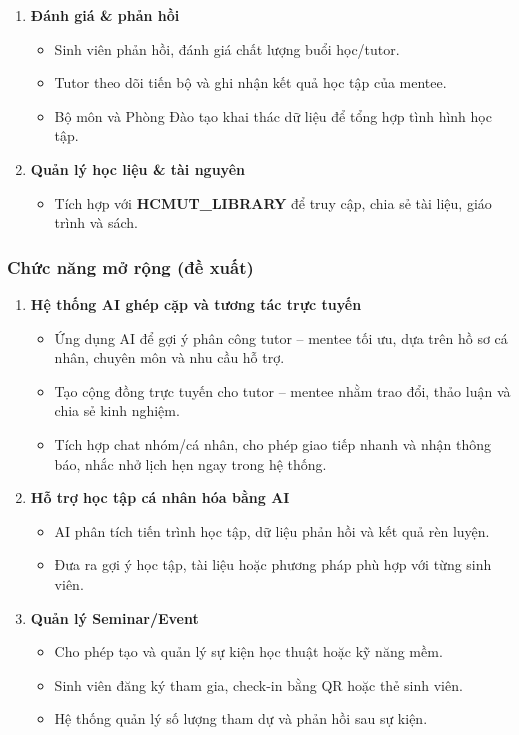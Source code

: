 \begin{enumerate}
    \item \textbf{Đánh giá \& phản hồi}
    \begin{itemize}
        \item Sinh viên phản hồi, đánh giá chất lượng buổi học/tutor.
        \item Tutor theo dõi tiến bộ và ghi nhận kết quả học tập của mentee.
        \item Bộ môn và Phòng Đào tạo khai thác dữ liệu để tổng hợp tình hình học tập.
    \end{itemize}

    \item \textbf{Quản lý học liệu \& tài nguyên}
    \begin{itemize}
        \item Tích hợp với \textbf{HCMUT\_LIBRARY} để truy cập, chia sẻ tài liệu, giáo trình và sách.
    \end{itemize}
\end{enumerate}

\subsubsection{Chức năng mở rộng (đề xuất)}

\begin{enumerate}
    \item \textbf{Hệ thống AI ghép cặp và tương tác trực tuyến}
    \begin{itemize}
        \item Ứng dụng AI để gợi ý phân công tutor -- mentee tối ưu, dựa trên hồ sơ cá nhân, chuyên môn và nhu cầu hỗ trợ.
        \item Tạo cộng đồng trực tuyến cho tutor -- mentee nhằm trao đổi, thảo luận và chia sẻ kinh nghiệm.
        \item Tích hợp chat nhóm/cá nhân, cho phép giao tiếp nhanh và nhận thông báo, nhắc nhở lịch hẹn ngay trong hệ thống.
    \end{itemize}

    \item \textbf{Hỗ trợ học tập cá nhân hóa bằng AI}
    \begin{itemize}
        \item AI phân tích tiến trình học tập, dữ liệu phản hồi và kết quả rèn luyện.
        \item Đưa ra gợi ý học tập, tài liệu hoặc phương pháp phù hợp với từng sinh viên.
    \end{itemize}

    \item \textbf{Quản lý Seminar/Event}
    \begin{itemize}
        \item Cho phép tạo và quản lý sự kiện học thuật hoặc kỹ năng mềm.
        \item Sinh viên đăng ký tham gia, check-in bằng QR hoặc thẻ sinh viên.
        \item Hệ thống quản lý số lượng tham dự và phản hồi sau sự kiện.
    \end{itemize}
\end{enumerate}


